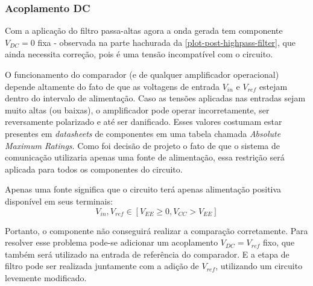 	\subsubsection{Acoplamento DC}\label{section:dc-bias}
	Com a aplicação do filtro passa-altas agora a onda gerada tem componente $V_{DC} = 0$ fixa - observada na parte hachurada da \autoref{plot-post-highpass-filter}, que ainda necessita correção, pois é uma tensão incompatível com o circuito.

	O funcionamento do comparador (e de qualquer amplificador operacional) depende altamente do fato de que as voltagens de entrada $V_{in}$ e $V_{ref}$ estejam dentro do intervalo de alimentação. Caso as tensões aplicadas nas entradas sejam muito altas (ou baixas), o amplificador pode operar incorretamente, ser reversamente polarizado e até ser danificado. Esses valores costumam estar presentes em \textit{datasheets} de componentes em uma tabela chamada \emph{Absolute Maximum Ratings}. Como foi decisão de projeto o fato de que o sistema de comunicação utilizaria apenas uma fonte de alimentação, essa restrição será aplicada para todos os componentes do circuito.

	Apenas uma fonte significa que o circuito terá apenas alimentação positiva disponível em seus terminais:
	\begin{equation}
	V_{in}, V_{ref} \in [V_{EE} \geq 0, V_{CC} > V_{EE}]
	\end{equation}

	Portanto, o componente não conseguirá realizar a comparação corretamente. Para resolver esse problema pode-se adicionar um acoplamento $V_{DC} = V_{ref}$ fixo, que também será utilizado na entrada de referência do comparador. E a etapa de filtro pode ser realizada juntamente com a adição de $V_{ref}$, utilizando um circuito levemente modificado.

